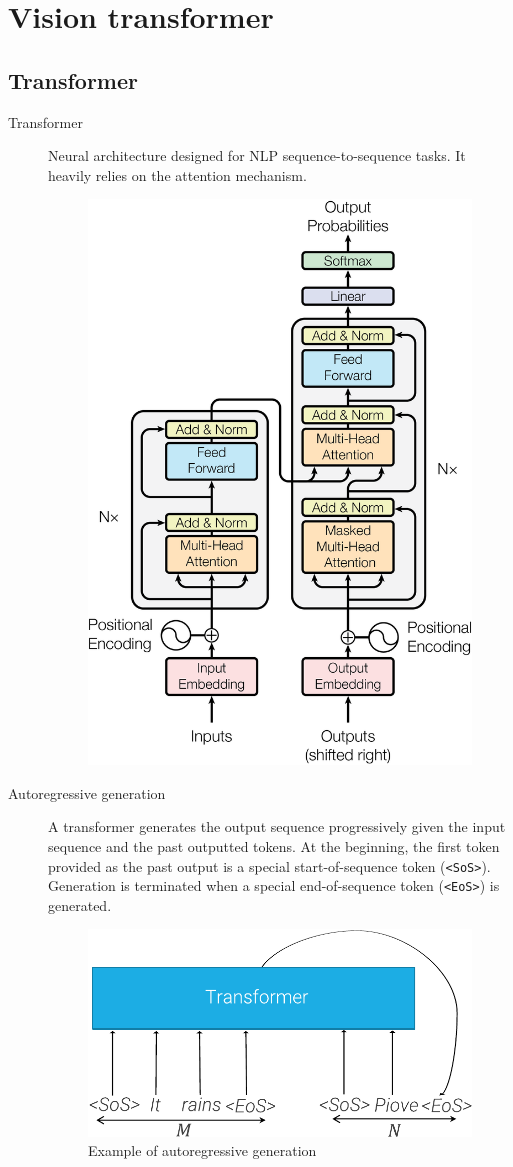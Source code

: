\chapter{Vision transformer}



\section{Transformer}

\begin{description}
    \item[Transformer] 
        Neural architecture designed for NLP sequence-to-sequence tasks. It heavily relies on the attention mechanism.
        \begin{figure}[H]
            \centering
            \includegraphics[width=0.4\linewidth]{./img/transformer.png}
        \end{figure}

    \item[Autoregressive generation] 
        A transformer generates the output sequence progressively given the input sequence and the past outputted tokens. At the beginning, the first token provided as the past output is a special start-of-sequence token (\texttt{<SoS>}). Generation is terminated when a special end-of-sequence token (\texttt{<EoS>}) is generated.

        \begin{figure}[H]
            \centering
            \includegraphics[width=0.3\linewidth]{./img/_transformer_autoregressive.pdf}
            \caption{Example of autoregressive generation}
        \end{figure}
\end{description}


